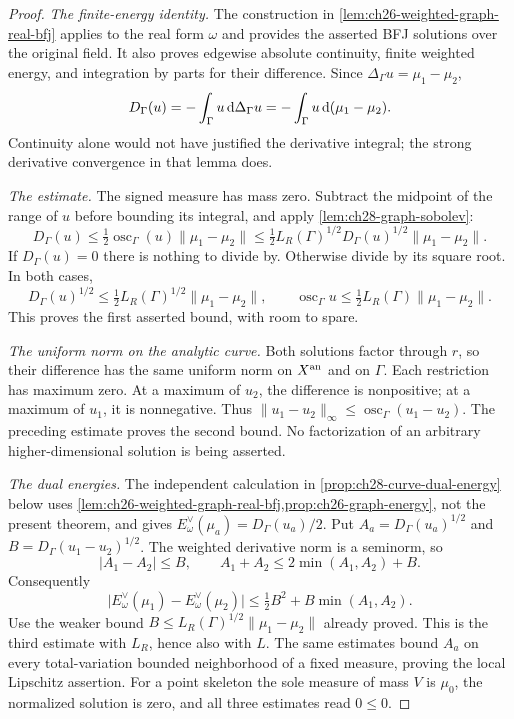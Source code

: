 \begin{proof}
\emph{The finite-energy identity.}
The construction in \cref{lem:ch26-weighted-graph-real-bfj} applies to
the real form \(\omega\) and provides the asserted BFJ solutions over
the original field.  It also proves edgewise absolute continuity,
finite weighted energy, and integration by parts for their difference.
Since \(\Delta_\Gamma u=\mu_1-\mu_2\),
\begin{equation}
\label{eq:ch28-stability-dirichlet-identity}
 D_\Gamma(u)=-\int_\Gamma u\,\mathrm d\Delta_\Gamma u
            =-\int_\Gamma u\,\mathrm d(\mu_1-\mu_2).
\end{equation}
Continuity alone would not have justified the derivative integral; the
strong derivative convergence in that lemma does.

\emph{The estimate.}
The signed measure has mass zero.  Subtract the midpoint of the range of
\(u\) before bounding its integral, and apply
\cref{lem:ch28-graph-sobolev}:
\[
 D_\Gamma(u)
 \leq\tfrac12\operatorname{osc}_\Gamma(u)\lVert\mu_1-\mu_2\rVert
 \leq\tfrac12 L_R(\Gamma)^{1/2}D_\Gamma(u)^{1/2}
                       \lVert\mu_1-\mu_2\rVert.
\]
If \(D_\Gamma(u)=0\) there is nothing to divide by.  Otherwise divide
by its square root.  In both cases,
\[
 D_\Gamma(u)^{1/2}
 \leq\tfrac12L_R(\Gamma)^{1/2}\lVert\mu_1-\mu_2\rVert,
 \qquad
 \operatorname{osc}_\Gamma u
 \leq\tfrac12L_R(\Gamma)\lVert\mu_1-\mu_2\rVert.
\]
This proves the first asserted bound, with room to spare.

\emph{The uniform norm on the analytic curve.}
Both solutions factor through \(r\), so their difference has the same
uniform norm on \(X^{\mathrm{an}}\) and on \(\Gamma\).  Each restriction has
maximum zero.  At a maximum of \(u_2\), the difference is nonpositive;
at a maximum of \(u_1\), it is nonnegative.  Thus
\(\lVert u_1-u_2\rVert_\infty\leq\operatorname{osc}_\Gamma(u_1-u_2)\).
The preceding estimate proves the second bound.  No factorization of
an arbitrary higher-dimensional solution is being asserted.

\emph{The dual energies.}
The independent calculation in \cref{prop:ch28-curve-dual-energy} below
uses \cref{lem:ch26-weighted-graph-real-bfj,prop:ch26-graph-energy}, not
the present theorem, and gives \(E^\vee_\omega(\mu_a)=D_\Gamma(u_a)/2\).
Put \(A_a=D_\Gamma(u_a)^{1/2}\) and \(B=D_\Gamma(u_1-u_2)^{1/2}\).
The weighted derivative norm is a seminorm, so
\[
 |A_1-A_2|\leq B,\qquad A_1+A_2\leq2\min(A_1,A_2)+B.
\]
Consequently
\[
 \bigl|E^\vee_\omega(\mu_1)-E^\vee_\omega(\mu_2)\bigr|
 \leq\tfrac12B^2+B\min(A_1,A_2).
\]
Use the weaker bound
\(B\leq L_R(\Gamma)^{1/2}\lVert\mu_1-\mu_2\rVert\) already proved.
This is the third estimate with \(L_R\), hence also with \(L\).
The same estimates bound \(A_a\) on every total-variation bounded
neighborhood of a fixed measure, proving the local Lipschitz assertion.
For a point skeleton the sole measure of mass \(V\) is \(\mu_0\),
the normalized solution is zero, and all three estimates read \(0\leq0\).
\end{proof}

